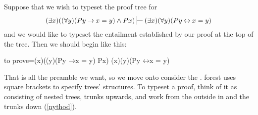 \documentclass[10pt,british,a4paper]{ltxdoc}
\newcommand*\pkg[1]{\textsf{#1}}
\newcommand*{\lif}{\ensuremath{\mathbin{\rightarrow}}}
\newcommand*{\liff}{\ensuremath{\mathbin{\leftrightarrow}}}
\begin{document}
Suppose that we wish to typeset the proof tree for
\[
  (\exists x)((\forall y)(Py \lif x = y) \land Px) \sststile{}{} (\exists x)(\forall y)(Py \liff x = y)
\]
and we would like to typeset the entailment established by our proof at the top of the tree.
Then we should begin like this:
\begin{latexcode}
\begin{prooftree}
  {
    to prove={(\exists x)((\forall y)(Py \lif x = y) \land Px) \sststile{}{} (\exists x)(\forall y)(Py \liff x = y)}
  }
\end{prooftree}
\end{latexcode}
That is all the preamble we want, so we move onto consider the .
\pkg{forest} uses square brackets to specify trees' structures.
To typeset a proof, think of it as consisting of nested trees, trunks upwards, and work from the outside in and the trunks down (\cref{nythod}).
\end{document}

